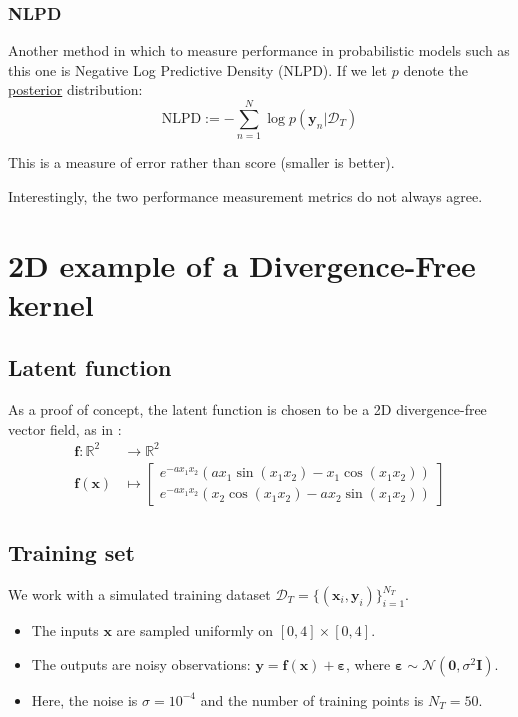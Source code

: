 \documentclass[12pt,a4paper,twoside]{report}
\theoremstyle{definition}
\begin{document}
\subsubsection{NLPD}\label{NLPD}
Another method in which to measure performance in probabilistic models such as this one is Negative Log Predictive Density (NLPD). If we let $p$ denote the \hyperref[posterior]{posterior} distribution:
\begin{equation*}
	\text{NLPD}:=-\sum_{n=1}^N \log p(\mathbf y_n|\mathcal D_T)
\end{equation*}

This is a measure of error rather than score (smaller is better).

Interestingly, the two performance measurement metrics do not always agree.

\section{2D example of a Divergence-Free kernel}
\subsection{Latent function}
As a proof of concept, the latent function is chosen to be a 2D divergence-free vector field, as in :
\begin{align*}
	\mathbf f:\mathbb{R}^2&\to\mathbb{R}^2\\
	\mathbf f(\mathbf x)&\mapsto \begin{bmatrix}e^{-a x_1 x_2}\left(a x_1 \sin \left(x_1 x_2\right)-x_1 \cos \left(x_1 x_2\right)\right)\\e^{-a x_1 x_2}\left(x_2 \cos \left(x_1 x_2\right)-a x_2 \sin \left(x_1 x_2\right)\right)\end{bmatrix}
\end{align*}

\subsection{Training set}
We work with a simulated training dataset $\mathcal{D}_T = \{(\mathbf x_i, \mathbf y_i)\}_{i=1}^{N_T}$.
\begin{itemize}
	\item The inputs $\mathbf{x}$ are sampled uniformly on $[0, 4]\times [0,4]$.
	\item The outputs are noisy observations: $\mathbf y = \mathbf f(\mathbf x)+\boldsymbol \varepsilon$, where $\boldsymbol \varepsilon \sim \mathcal N(\mathbf 0,\sigma^2 \mathbf I)$. 
	\item Here, the noise is $\sigma =10^{-4}$ and the number of training points is $N_T=50$.
\end{itemize}
\end{document}
